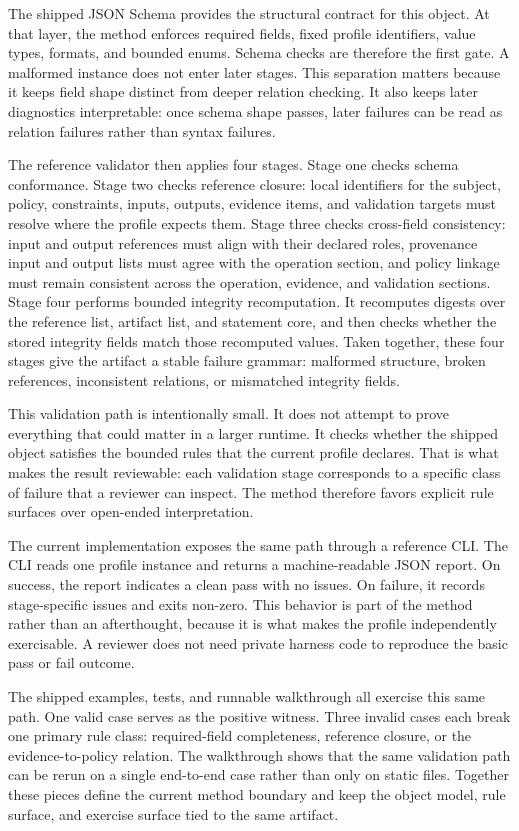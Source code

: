\documentclass[conference]{IEEEtran}
\begin{document}
The shipped JSON Schema provides the structural contract for this object. At that layer, the method enforces required fields, fixed profile identifiers, value types, formats, and bounded enums. Schema checks are therefore the first gate. A malformed instance does not enter later stages. This separation matters because it keeps field shape distinct from deeper relation checking. It also keeps later diagnostics interpretable: once schema shape passes, later failures can be read as relation failures rather than syntax failures.

The reference validator then applies four stages. Stage one checks schema conformance. Stage two checks reference closure: local identifiers for the subject, policy, constraints, inputs, outputs, evidence items, and validation targets must resolve where the profile expects them. Stage three checks cross-field consistency: input and output references must align with their declared roles, provenance input and output lists must agree with the operation section, and policy linkage must remain consistent across the operation, evidence, and validation sections. Stage four performs bounded integrity recomputation. It recomputes digests over the reference list, artifact list, and statement core, and then checks whether the stored integrity fields match those recomputed values. Taken together, these four stages give the artifact a stable failure grammar: malformed structure, broken references, inconsistent relations, or mismatched integrity fields.

This validation path is intentionally small. It does not attempt to prove everything that could matter in a larger runtime. It checks whether the shipped object satisfies the bounded rules that the current profile declares. That is what makes the result reviewable: each validation stage corresponds to a specific class of failure that a reviewer can inspect. The method therefore favors explicit rule surfaces over open-ended interpretation.

The current implementation exposes the same path through a reference CLI. The CLI reads one profile instance and returns a machine-readable JSON report. On success, the report indicates a clean pass with no issues. On failure, it records stage-specific issues and exits non-zero. This behavior is part of the method rather than an afterthought, because it is what makes the profile independently exercisable. A reviewer does not need private harness code to reproduce the basic pass or fail outcome.

The shipped examples, tests, and runnable walkthrough all exercise this same path. One valid case serves as the positive witness. Three invalid cases each break one primary rule class: required-field completeness, reference closure, or the evidence-to-policy relation. The walkthrough shows that the same validation path can be rerun on a single end-to-end case rather than only on static files. Together these pieces define the current method boundary and keep the object model, rule surface, and exercise surface tied to the same artifact.
\end{document}

